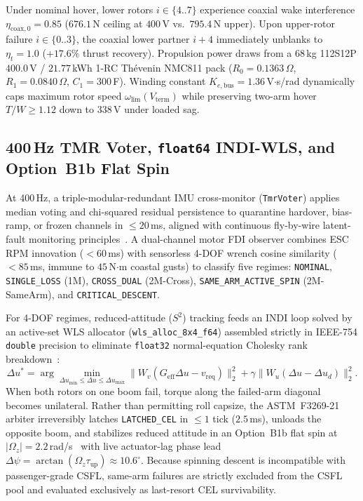 \documentclass[letterpaper, 10 pt, journal, twoside]{IEEEtran}
\begin{document}
Under nominal hover, lower rotors $i\in\{4..7\}$ experience coaxial wake interference $\eta_{\text{coax},0}=0.85$ ($676.1$\,N ceiling at $400$\,V vs.\ $795.4$\,N upper). Upon upper-rotor failure $i\in\{0..3\}$, the coaxial lower partner $i+4$ immediately unblanks to $\eta_t=1.0$ ($+17.6\%$ thrust recovery). Propulsion power draws from a $68$\,kg 112S12P $400.0$\,V / $21.77$\,kWh 1-RC Th\'evenin NMC811 pack ($R_0=0.1363\,\Omega$, $R_1=0.0840\,\Omega$, $C_1=300$\,F). Winding constant $K_{e,\text{bus}}=1.36$\,V$\cdot$s/rad dynamically caps maximum rotor speed $\omega_{\lim}(V_{\text{term}})$ while preserving two-arm hover $T/W\ge 1.12$ down to $338$\,V under loaded sag.

\subsection{400\,Hz TMR Voter, \texttt{float64} INDI-WLS, and Option~B1b Flat Spin}

At 400\,Hz, a triple-modular-redundant IMU cross-monitor (\texttt{TmrVoter}) applies median voting and chi-squared residual persistence to quarantine hardover, bias-ramp, or frozen channels in $\le 20$\,ms, aligned with continuous fly-by-wire latent-fault monitoring principles~\cite{easa_scvtol_2024}. A dual-channel motor FDI observer combines ESC RPM innovation ($<60$\,ms) with sensorless 4-DOF wrench cosine similarity ($<85$\,ms, immune to $45$\,N$\cdot$m coastal gusts) to classify five regimes: \texttt{NOMINAL}, \texttt{SINGLE\_LOSS} (1M), \texttt{CROSS\_DUAL} (2M-Cross), \texttt{SAME\_ARM\_ACTIVE\_SPIN} (2M-SameArm), and \texttt{CRITICAL\_DESCENT}.

For 4-DOF regimes, reduced-attitude ($S^2$) tracking feeds an INDI loop solved by an active-set WLS allocator (\texttt{wls\_alloc\_8x4\_f64}) assembled strictly in IEEE-754 \texttt{double} precision to eliminate \texttt{float32} normal-equation Cholesky rank breakdown~\cite{smeur_indi_wls_2017}:
\begin{equation}
  \Delta u^* = \arg\min_{\Delta u_{\min}\le \Delta u\le \Delta u_{\max}} \bigl\|W_v(G_{\text{eff}}\Delta u - v_{\text{req}})\bigr\|_2^2 + \gamma\bigl\|W_u(\Delta u - \Delta u_d)\bigr\|_2^2.
  \label{eq:wls}
\end{equation}
When both rotors on one boom fail, torque along the failed-arm diagonal becomes unilateral. Rather than permitting roll capsize, the ASTM~F3269-21 arbiter irreversibly latches \texttt{LATCHED\_CEL} in $\le 1$ tick ($2.5$\,ms), unloads the opposite boom, and stabilizes reduced attitude in an Option~B1b flat spin at $|\Omega_z|=2.2$\,rad/s~\cite{mueller_relaxed_hover_2014} with live actuator-lag phase lead $\Delta\psi=\arctan(\Omega_z\tau_{\text{up}})\approx 10.6^\circ$. Because spinning descent is incompatible with passenger-grade CSFL, same-arm failures are strictly excluded from the CSFL pool and evaluated exclusively as last-resort CEL survivability.
\end{document}
